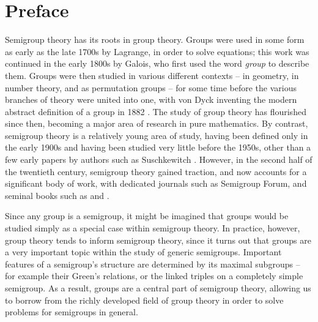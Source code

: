 \chapter*{Preface}

Semigroup theory has its roots in group theory.  Groups were used in some form
as early as the late 1700s by Lagrange, in order to solve equations; this work
was continued in the early 1800s by Galois, who first used the word
\textit{group} to describe them.  Groups were then studied in various different
contexts -- in geometry, in number theory, and as permutation groups -- for some
time before the various branches of theory were united into one, with von Dyck
inventing the modern abstract definition of a group in 1882 \cite{dyck_1882}.
The study of group theory has flourished since then, becoming a major area of
research in pure mathematics.  By contrast, semigroup theory is a relatively
young area of study, having been defined only in the early 1900s and having been
studied very little before the 1950s, other than a few early papers by authors
such as Suschkewitch \cite{susch_1928}.  However, in the second half of the
twentieth century, semigroup theory gained traction, and now accounts for a
significant body of work, with dedicated journals such as Semigroup Forum, and
seminal books such as \cite{howie} and \cite{petrich}.

Since any group is a semigroup, it might be imagined that groups would be
studied simply as a special case within semigroup theory.  In practice, however,
group theory tends to inform semigroup theory, since it turns out that groups
are a very important topic within the study of generic semigroups.  Important
features of a semigroup's structure are determined by its maximal subgroups --
for example their Green's relations, or the linked triples on a completely
simple semigroup.  As a result, groups are a central part of semigroup theory,
allowing us to borrow from the richly developed field of group theory in order
to solve problems for semigroups in general.

